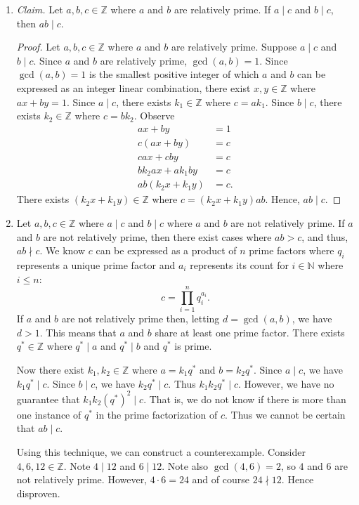 \documentclass{article}
\newcommand{\Z}{\mathbb{Z}}
\newcommand{\N}{\mathbb{N}}
\theoremstyle{definition}
\begin{document}
\begin{solution}
\begin{enumerate}
\item\textit{Claim. }Let $a,b,c\in\Z$ where $a$ and $b$ are relatively prime. If $a\mid c$ and $b\mid c$, then $ab\mid c$.
\begin{proof}
Let $a,b,c\in\Z$ where $a$ and $b$ are relatively prime. Suppose $a\mid c$ and $b\mid c$. Since $a$ and $b$ are relatively prime, $\gcd(a,b)=1$. Since $\gcd(a,b)=1$ is the smallest positive integer of which $a$ and $b$ can be expressed as an integer linear combination, there exist $x,y\in\Z$ where $ax+by=1$. Since $a\mid c$, there exists $k_1\in\Z$ where $c=ak_1$. Since $b\mid c$, there exists $k_2\in\Z$ where $c=bk_2$. Observe
\begin{align*}
ax+by&=1\\
c(ax+by)&=c\\
cax+cby&=c\\
bk_2ax+ak_1by&=c\\
ab(k_2x+k_1y)&=c.
\end{align*}
There exists $(k_2x+k_1y)\in\Z$ where $c=(k_2x+k_1y)ab$. Hence, $ab\mid c$.
\end{proof}
\item Let $a,b,c\in\Z$ where $a\mid c$ and $b\mid c$ where $a$ and $b$ are not relatively prime. If $a$ and $b$ are not relatively prime, then there exist cases where $ab>c$, and thus, $ab\nmid c$. We know $c$ can be expressed as a product of $n$ prime factors where $q_i$ represents a unique prime factor and $a_i$ represents its count for $i\in\N$ where $i\leq n$:
\[c=\prod_{i=1}^n{q_i^{a_i}}.\]
If $a$ and $b$ are not relatively prime then, letting $d=\gcd(a,b)$, we have $d>1$. This means that $a$ and $b$ share at least one prime factor. There exists $q^*\in\Z$ where $q^*\mid a$ and $q^*\mid b$ and $q^*$ is prime.

Now there exist $k_1,k_2\in\Z$ where $a=k_1q^*$ and $b=k_2q^*$. Since $a\mid c$, we have $k_1q^*\mid c$. Since $b\mid c$, we have $k_2q^*\mid c$. Thus $k_1k_2q^*\mid c$. However, we have no guarantee that $k_1k_2(q^*)^2\mid c$. That is, we do not know if there is more than one instance of  $q^*$ in the prime factorization of $c$. Thus we cannot be certain that $ab\mid c$.

Using this technique, we can construct a counterexample. Consider $4,6,12\in\Z$. Note $4\mid 12$ and $6\mid 12$. Note also $\gcd(4,6)=2$, so $4$ and $6$ are not relatively prime. However, $4\cdot 6=24$ and of course $24\nmid 12$. Hence disproven.
\end{enumerate}
\end{solution}
\end{document}
